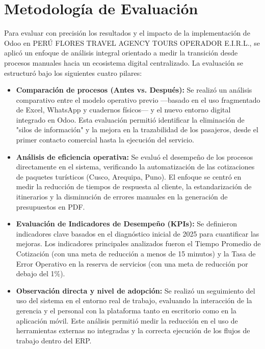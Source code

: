 \section{Metodología de Evaluación}

Para evaluar con precisión los resultados y el impacto de la implementación de Odoo en PERÚ FLORES TRAVEL AGENCY TOURS OPERADOR E.I.R.L., se aplicó un enfoque de análisis integral orientado a medir la transición desde procesos manuales hacia un ecosistema digital centralizado. La evaluación se estructuró bajo los siguientes cuatro pilares:

\begin{itemize}
    \item \textbf{Comparación de procesos (Antes vs. Después):} Se realizó un análisis comparativo entre el modelo operativo previo ---basado en el uso fragmentado de Excel, WhatsApp y cuadernos físicos--- y el nuevo entorno digital integrado en Odoo. Esta evaluación permitió identificar la eliminación de "silos de información" y la mejora en la trazabilidad de los pasajeros, desde el primer contacto comercial hasta la ejecución del servicio.
    \item \textbf{Análisis de eficiencia operativa:} Se evaluó el desempeño de los procesos directamente en el sistema, verificando la automatización de las cotizaciones de paquetes turísticos (Cusco, Arequipa, Puno). El enfoque se centró en medir la reducción de tiempos de respuesta al cliente, la estandarización de itinerarios y la disminución de errores manuales en la generación de presupuestos en PDF.
    \item \textbf{Evaluación de Indicadores de Desempeño (KPIs):} Se definieron indicadores clave basados en el diagnóstico inicial de 2025 para cuantificar las mejoras. Los indicadores principales analizados fueron el Tiempo Promedio de Cotización (con una meta de reducción a menos de 15 minutos) y la Tasa de Error Operativo en la reserva de servicios (con una meta de reducción por debajo del 1\%).
    \item \textbf{Observación directa y nivel de adopción:} Se realizó un seguimiento del uso del sistema en el entorno real de trabajo, evaluando la interacción de la gerencia y el personal con la plataforma tanto en escritorio como en la aplicación móvil. Este análisis permitió medir la reducción en el uso de herramientas externas no integradas y la correcta ejecución de los flujos de trabajo dentro del ERP.
\end{itemize}

